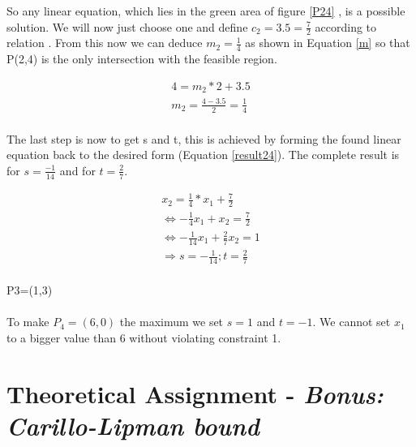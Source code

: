 \documentclass[%
   10pt,              %
   nenglish,           %
   a4paper,           %
   DIV11,             %
]{scrartcl}%
\begin{document}
 So any linear equation, which lies in the green area of figure \ref{P24} , is a possible solution. We will now just choose one and define $c_2 = 3.5 = \frac{7}{2}$ according to relation \label{rel2}. From this now we can deduce $m_2=\frac{1}{4}$ as shown in Equation \ref{m} so that P(2,4) is the only intersection with the feasible region.

\begin{eqnarray}
4=m_2 * 2+3.5\\
m_2 = \frac{4-3.5}{2}  = \frac{1}{4} \label{m}\\
\end{eqnarray}

The last step is now to get s and t, this is achieved by forming the found linear equation back to the desired form (Equation \ref{result24}). The complete result is for $s=\frac{-1}{14}$ and for $t= \frac{2}{7}$.

\begin{eqnarray}
x_2=\frac{1}{4} * x_1 + \frac{7}{2}\\
 	\Leftrightarrow 	- \frac{1}{4} x_1 + x_2=\frac{7}{2}\\
 	\Leftrightarrow 	- \frac{1}{14} x_1 + \frac{2}{7} x_2 = 1 \label{result24}\\
\Rightarrow s= - \frac{1}{14} ; t=\frac{2}{7}\\
\end{eqnarray}


P3=(1,3)\\
\\
\noindent To make $P_4=(6,0)$ the maximum we set $s = 1$ and $t = -1$. We cannot set $x_1$ to a bigger value 
than 6 without violating constraint 1.

\section*{Theoretical Assignment - \textsl{Bonus: Carillo-Lipman bound}}

%
%
 
\end{document}
